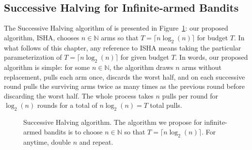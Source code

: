 




\subsection{Successive Halving for Infinite-armed Bandits}\label{theory}
The Successive Halving algorithm of \cite{icml2013_karnin13} is presented in Figure~\ref{alg-SH}: our proposed algorithm, ISHA,
	chooses $n \in \mathbb{N}$ arms so that $T=\lceil n\log_2(n)\rceil$
	for budget $T$.
In what follows of this chapter, any reference to ISHA means taking the particular parameterization of $T=\lceil n \log_2(n) \rceil$ for given budget $T$.
In words, our proposed algorithm is simple: for some $n \in \mathbb{N}$, the algorithm draws $n$ arms without replacement, pulls each arm once, discards the worst half, and on each successive round pulls the surviving arms twice as many times as the previous round before discarding the worst half. The whole process takes $n$ pulls per round for $\log_2(n)$ rounds for a total of $n \log_2(n) = T$ total pulls.

\begin{figure}[h]
\centering
{}
\caption{Successive Halving algorithm. The algorithm we propose for infinite-armed bandits is to choose $n \in \mathbb{N}$ so that $T = \lceil n \log_2(n) \rceil$. For anytime, double $n$ and repeat.}\label{alg-SH}
\end{figure}

